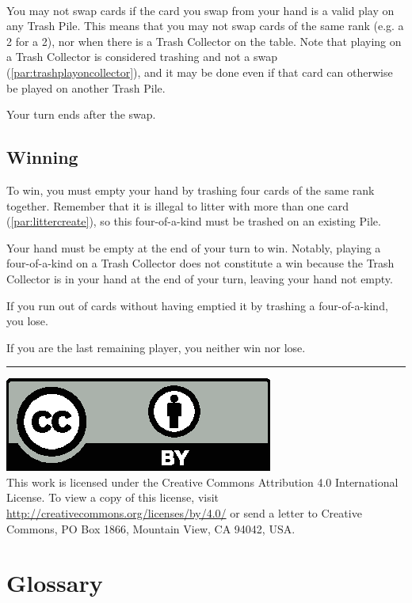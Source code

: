 \documentclass{article}
\newcommand\copyrightfooter{
  \medskip
  \hrule

  {
    \small
    \includegraphics[scale=0.5]{cc-by.eps}\\
    This work is licensed under the Creative Commons Attribution 4.0
    International License. To view a copy of this license, visit
    \url{http://creativecommons.org/licenses/by/4.0/} or send a letter to Creative Commons, PO Box 1866, Mountain View, CA 94042, USA.
  }
}
\begin{document}
\paragraph{} \label{par:swaprestriction}
You may not swap cards if the card you swap from your hand is a valid play on any Trash Pile. This means that you may not swap cards of the same rank (e.g. a 2 for a 2), nor when there is a Trash Collector on the table. Note that playing on a Trash Collector is considered trashing and not a swap (\autoref{par:trashplayoncollector}), and it may be done even if that card can otherwise be played on another Trash Pile.

Your turn ends after the swap.

\subsection{Winning}
\label{sec:winning}

To win, you must empty your hand by trashing four cards of the same rank together. Remember that it is illegal to litter with more than one card (\autoref{par:littercreate}), so this four-of-a-kind must be trashed on an existing Pile.

Your hand must be empty at the end of your turn to win. Notably, playing a four-of-a-kind on a Trash Collector does not constitute a win because the Trash Collector is in your hand at the end of your turn, leaving your hand not empty.

If you run out of cards without having emptied it by trashing a four-of-a-kind, you lose.

If you are the last remaining player, you neither win nor lose.

\copyrightfooter

\newpage
\appendix
\section{Glossary}
\label{sec:glossary}
\end{document}
